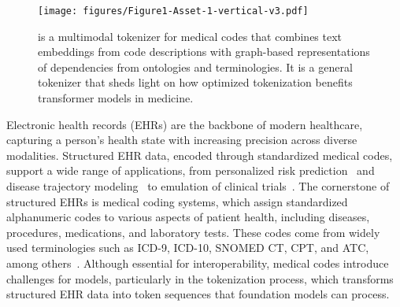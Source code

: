 
\begin{figure}[!htbp]       
    \centerline{\texttt{[image: figures/Figure1-Asset-1-vertical-v3.pdf]}}
    \caption{\model is a multimodal tokenizer for medical codes that combines text embeddings from code descriptions with graph-based representations of dependencies from ontologies and terminologies. It is a general tokenizer that sheds light on how optimized tokenization benefits transformer models in medicine.}
    \label{fig:figure1}
    \vspace{-4mm}
\end{figure}

Electronic health records (EHRs) are the backbone of modern healthcare, capturing a person's health state with increasing precision across diverse modalities. Structured EHR data, encoded through standardized medical codes, support a wide range of applications, from personalized risk prediction~\cite{Goldstein2016risk,yu2024risk} and disease trajectory modeling~\cite{Jensen2017traj,Heumos2024ehrpy} to emulation of clinical trials~\cite{Katsoulakis2024digitaltwins,Kraljevic2024trial}. The cornerstone of structured EHRs is medical coding systems, which assign standardized alphanumeric codes to various aspects of patient health, including diseases, procedures, medications, and laboratory tests. These codes come from widely used terminologies such as ICD-9, ICD-10, SNOMED CT, CPT, and ATC, among others~\cite{foley1992comorbidities,world1988international,world2004international,donnelly2006snomed,dotson2013cpt,miller1995new}. Although essential for interoperability, medical codes introduce challenges for models, particularly in the tokenization process, which transforms structured EHR data into token sequences that foundation models can process.


